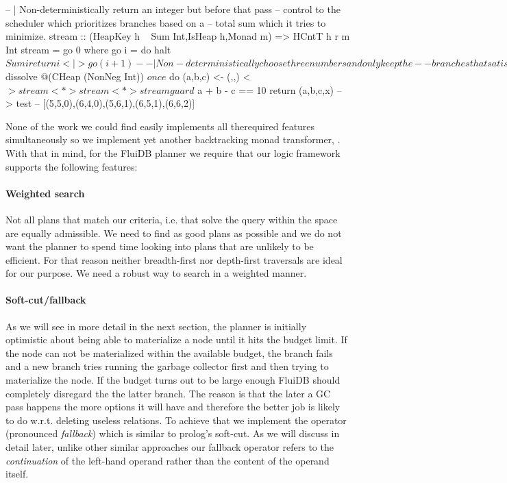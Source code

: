 \begin{code}
\begin{haskellcode}
  -- | Non-deterministically return an integer but before that pass
  -- control to the scheduler which prioritizes branches based on a
  -- total sum which it tries to minimize.
  stream :: (HeapKey h ~ Sum Int,IsHeap h,Monad m) => HCntT h r m Int
  stream = go 0 where
    go i = do
      halt $ Sum i
      return i <|> go (i+1)

  -- | Non-deterministically choose three numbers and only keep the
  -- branches that satisfy a + b - c == 10. Avoid diverging by prefering
  -- branches for which the sum of the numbers is minimum.
  test2 :: IO [(Int,Int,Int)]
  test2 = takeListT 5 $ dissolve @(CHeap (NonNeg Int)) $ once $ do
    (a,b,c) <- (,,) <$> stream <*> stream <*> stream
    guard $ a + b - c == 10
    return (a,b,c,x)
  -- > test
  -- [(5,5,0),(6,4,0),(5,6,1),(6,5,1),(6,6,2)]
\end{haskellcode}
  \caption{\label{lst:halt_example}Prioritise branches that we want to
    be executed first.}
\end{code}

None of the work we could find easily implements all therequired
features simultaneously so we implement yet another backtracking monad
transformer, . With that in mind, for the FluiDB planner
we require that our logic framework supports the following features:

\paragraph{Weighted search}
Not all plans that match our criteria, i.e. that
solve the query within the space are equally admissible. We need to
find as good plans as possible and we do not want the planner to spend
time looking into plans that are unlikely to be efficient. For that
reason neither breadth-first nor depth-first traversals are ideal for
our purpose. We need a robust way to search in a weighted manner.

\paragraph{Soft-cut/fallback}
As we will see in more detail in the next section, the planner is
initially optimistic about being able to materialize a node until it
hits the budget limit. If the node can not be materialized within the
available budget, the branch fails and a new branch tries running the
garbage collector first and then trying to materialize the node.  If
the budget turns out to be large enough FluiDB should completely
disregard the the latter branch.  The reason is that the later a GC
pass happens the more options it will have and therefore the better
job is likely to do w.r.t. deleting useless relations.  To achieve
that we implement the operator \hask{<//>} (pronounced
\emph{fallback}) which is similar to prolog's soft-cut. As we will
discuss in detail later, unlike other similar approaches our fallback
operator refers to the \emph{continuation} of the left-hand operand
rather than the content of the operand itself.


